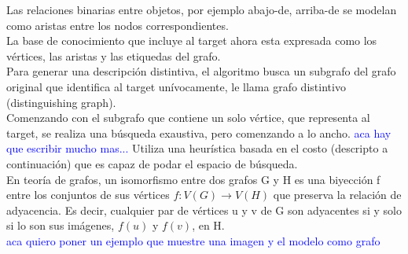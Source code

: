 Las relaciones binarias entre objetos, por ejemplo abajo-de, arriba-de se modelan como aristas entre los nodos correspondientes.\\

La base de conocimiento que incluye al target ahora esta expresada como los v\'ertices, las aristas y las etiquedas del grafo.\\


Para generar una descripci\'on distintiva, el algoritmo busca un subgrafo del grafo original que identifica al target un\'{i}vocamente, le llama grafo distintivo (distinguishing graph).\\

Comenzando con el subgrafo que contiene un solo v\'ertice, que representa al target, se realiza una b\'usqueda exaustiva, pero comenzando a lo ancho. \textcolor{blue}{aca hay que escribir mucho mas...} Utiliza una heur\'{i}stica basada en el costo (descripto a continuaci\'on) que es capaz de podar el espacio de b\'usqueda.\\



En teor\'{i}a de grafos, un isomorfismo entre dos grafos G y H es una biyecci\'on f entre los conjuntos de sus v\'ertices $f:V(G) \rightarrow V(H)$ que preserva la relaci\'on de adyacencia. Es decir, cualquier par de v\'ertices u y v de G son adyacentes si y solo si lo son sus im\'agenes, $f(u)$ y $f(v)$, en H.\\

\textcolor{blue}{aca quiero poner un ejemplo que muestre una imagen y el modelo como grafo}

